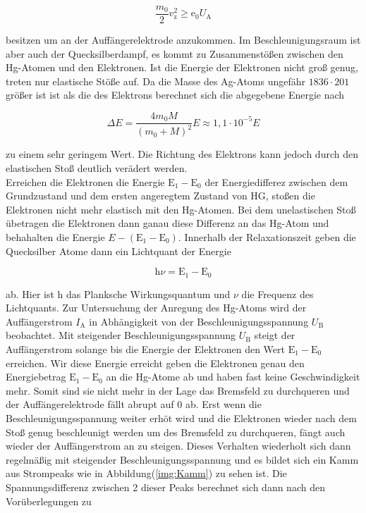         \begin{equation*}
            \frac{m_0}{2} v_{\text{z}}^2 \geq \text{e}_0 U_{\text{A}}
        \end{equation*}

        \noindent besitzen um an der Auffängerelektrode anzukommen.
        Im Beschleunigungsraum ist aber auch der Quecksilberdampf, es kommt zu Zusammenstößen zwischen den Hg-Atomen und den Elektronen.
        Ist die Energie der Elektronen nicht groß genug, treten nur elastische Stöße auf. Da die Masse des Ag-Atoms ungefähr $1836 \cdot 201$ 
        größer ist ist als die des Elektrons berechnet sich die abgegebene Energie nach 

        \begin{equation*}
            \Delta E = \frac{4 m_0 M}{\left(m_0 + M \right)^2} E \approx 1,1 \cdot 10^{-5} E
        \end{equation*}

        \noindent zu einem sehr geringem Wert. Die Richtung des Elektrons kann jedoch durch den elastischen Stoß deutlich verädert werden.\\
        Erreichen die Elektronen die Energie $\text{E}_1 - \text{E}_0$ der Energiedifferez zwischen dem Grundzustand und dem ersten angeregtem Zustand von HG, 
        stoßen die Elektronen nicht mehr elastisch mit den Hg-Atomen. Bei dem unelastischen Stoß übetragen die Elektronen dann ganau diese 
        Differenz an das Hg-Atom und behahalten die Energie $E - (\text{E}_1 - \text{E}_0)$. Innerhalb der Relaxationszeit geben die Quecksilber 
        Atome dann ein Lichtquant der Energie

        \begin{equation*}
            \text{h} \nu = \text{E}_1 - \text{E}_0 
        \end{equation*}

        \noindent ab. Hier ist h das Planksche Wirkungsquantum und $\nu$ die Frequenz des Lichtquants.
        Zur Untersuchung der Anregung des Hg-Atoms wird der Auffängerstrom $I_\text{A}$ in Abhängigkeit von der Beschleunigungsspannung $U_\text{B}$ 
        beobachtet. Mit steigender Beschleunigungsspannung $U_\text{B}$ steigt der Auffängerstrom solange bis die Energie der Elektronen 
        den Wert $\text{E}_1 - \text{E}_0$ erreichen. Wir diese Energie erreicht geben die Elektronen genau den Energiebetrag $\text{E}_1 - \text{E}_0$ 
        an die Hg-Atome ab und haben fast keine Geschwindigkeit mehr. Somit sind sie nicht mehr in der Lage das Bremsfeld zu durchqueren und der 
        Auffängerelektrode fällt abrupt auf 0 ab. Erst wenn die Beschleunigungsspannung weiter erhöt wird und die Elektronen wieder nach dem 
        Stoß genug beschleunigt werden um des Bremsfeld zu durchqueren, fängt auch wieder der Auffängerstrom an zu steigen. Dieses Verhalten 
        wiederholt sich dann regelmäßig mit steigender Beschleunigungsspannung und es bildet sich ein Kamm aus Strompeaks wie in Abbildung(\ref{img:Kamm})
        zu sehen ist. Die Spannungsdifferenz zwischen 2 dieser Peaks berechnet sich dann nach den Vorüberlegungen zu 

